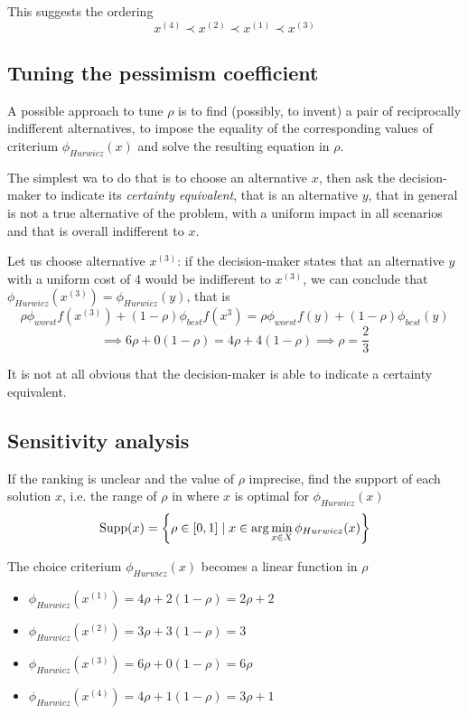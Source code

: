 This suggests the ordering
$$ x^{(4)} \prec x^{(2)} \prec x^{(1)} \prec x^{(3)} $$

\subsection{Tuning the pessimism coefficient}

A possible approach to tune $\rho$ is to find (possibly, to invent) a pair of reciprocally indifferent alternatives, to impose the equality of the corresponding values of criterium $\phi_{Hurwicz} (x)$ and solve the resulting equation in $\rho$.

The simplest wa to do that is to choose an alternative $x$, then ask the decision-maker to indicate its \textit{certainty equivalent}, that is an alternative $y$, that in general is not a true alternative of the problem, with a uniform impact in all scenarios and that is overall indifferent to $x$.

Let us choose alternative $x^{(3)}$:  if the decision-maker states that an alternative $y$ with a uniform cost of 4 would be indifferent to $x^{(3)}$, we can conclude that $\phi_{Hurwicz}(x^{(3)}) = \phi_{Hurwicz} (y)$, that is
$$ \rho \phi_{worst} f (x^{(3)}) + (1 - \rho) \phi_{best} f(x^{3}) = \rho \phi_{worst} f(y) + (1-\rho) \phi_{best} (y) $$
$$ \implies 6 \rho + 0(1-\rho) = 4 \rho + 4(1-\rho) \implies \rho = \frac{2}{3} $$

It is not at all obvious that the decision-maker is able to indicate a certainty equivalent.

\subsection{Sensitivity analysis}

If the ranking is unclear and the value of $\rho$ imprecise, find the support of each solution $x$, i.e. the range of $\rho$ in where $x$ is optimal for $\phi_{Hurwicz} (x)$
$$ \operatorname{Supp} (x) = \left\{\rho \in [0,1] \mid x \in \arg \min_{x \in X} \phi_{Hurwicz} (x) \right\}$$

The choice criterium $\phi_{Hurwicz} (x)$ becomes a linear function in $\rho$
\begin{itemize}
	\item $\phi_{Hurwicz} \left(x^{(1)}\right) = 4 \rho + 2(1 - \rho) = 2 \rho + 2$

	\item $\phi_{Hurwicz} \left(x^{(2)}\right) = 3 \rho + 3(1 - \rho) = 3$
	
	\item $\phi_{Hurwicz} \left(x^{(3)}\right) = 6\rho + 0(1 - \rho) = 6 \rho$ 
	
	\item $\phi_{Hurwicz} \left(x^{(4)}\right) = 4 \rho + 1 (1 - \rho) = 3 \rho + 1$
\end{itemize}

